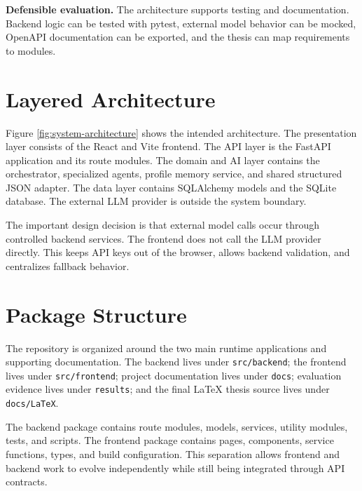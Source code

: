 \textbf{Defensible evaluation.} The architecture supports testing and documentation. Backend logic can be tested with pytest, external model behavior can be mocked, OpenAPI documentation can be exported, and the thesis can map requirements to modules.

\section{Layered Architecture}

Figure \ref{fig:system-architecture} shows the intended architecture. The presentation layer consists of the React and Vite frontend. The API layer is the FastAPI application and its route modules. The domain and AI layer contains the orchestrator, specialized agents, profile memory service, and shared structured JSON adapter. The data layer contains SQLAlchemy models and the SQLite database. The external LLM provider is outside the system boundary.


The important design decision is that external model calls occur through controlled backend services. The frontend does not call the LLM provider directly. This keeps API keys out of the browser, allows backend validation, and centralizes fallback behavior.

\section{Package Structure}

The repository is organized around the two main runtime applications and supporting documentation. The backend lives under \texttt{src/backend}; the frontend lives under \texttt{src/frontend}; project documentation lives under \texttt{docs}; evaluation evidence lives under \texttt{results}; and the final LaTeX thesis source lives under \texttt{docs/LaTeX}.


The backend package contains route modules, models, services, utility modules, tests, and scripts. The frontend package contains pages, components, service functions, types, and build configuration. This separation allows frontend and backend work to evolve independently while still being integrated through API contracts.

